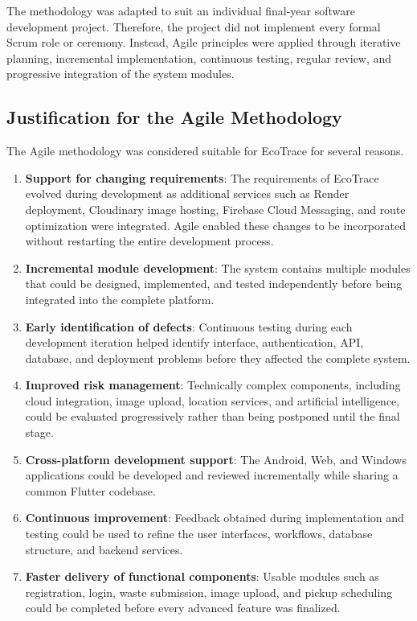 The methodology was adapted to suit an individual final-year software
development project. Therefore, the project did not implement every formal
Scrum role or ceremony. Instead, Agile principles were applied through iterative
planning, incremental implementation, continuous testing, regular review, and
progressive integration of the system modules.

\subsection{Justification for the Agile Methodology}

The Agile methodology was considered suitable for EcoTrace for several reasons.

\begin{enumerate}[leftmargin=1.4cm]
  \item \textbf{Support for changing requirements}: The requirements of EcoTrace
    evolved during development as additional services such as Render
    deployment, Cloudinary image hosting, Firebase Cloud Messaging, and route
    optimization were integrated. Agile enabled these changes to be incorporated
    without restarting the entire development process.
  \item \textbf{Incremental module development}: The system contains multiple
    modules that could be designed, implemented, and tested independently
    before being integrated into the complete platform.
  \item \textbf{Early identification of defects}: Continuous testing during each
    development iteration helped identify interface, authentication, API,
    database, and deployment problems before they affected the complete
    system.
  \item \textbf{Improved risk management}: Technically complex components,
    including cloud integration, image upload, location services, and artificial
    intelligence, could be evaluated progressively rather than being postponed
    until the final stage.
  \item \textbf{Cross-platform development support}: The Android, Web, and
    Windows applications could be developed and reviewed incrementally while
    sharing a common Flutter codebase.
  \item \textbf{Continuous improvement}: Feedback obtained during
    implementation and testing could be used to refine the user interfaces,
    workflows, database structure, and backend services.
  \item \textbf{Faster delivery of functional components}: Usable modules such
    as registration, login, waste submission, image upload, and pickup
    scheduling could be completed before every advanced feature was finalized.
\end{enumerate}

